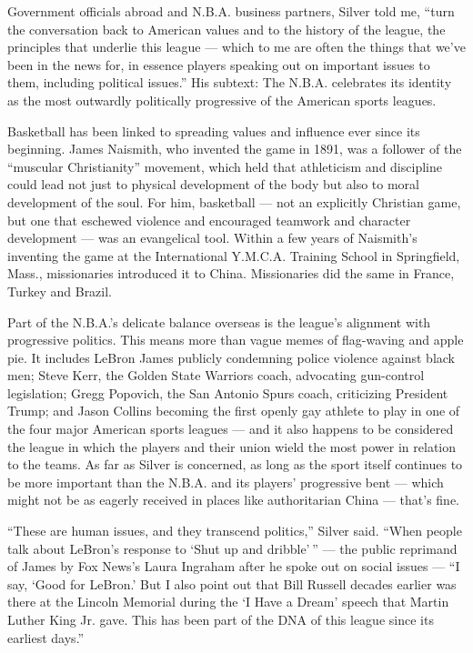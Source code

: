 Government officials abroad and N.B.A. business partners, Silver told
me, ``turn the conversation back to American values and to the history
of the league, the principles that underlie this league --- which to me
are often the things that we've been in the news for, in essence players
speaking out on important issues to them, including political issues.''
His subtext: The N.B.A. celebrates its identity as the most outwardly
politically progressive of the American sports leagues.

Basketball has been linked to spreading values and influence ever since
its beginning. James Naismith, who invented the game in 1891, was a
follower of the ``muscular Christianity'' movement, which held that
athleticism and discipline could lead not just to physical development
of the body but also to moral development of the soul. For him,
basketball --- not an explicitly Christian game, but one that eschewed
violence and encouraged teamwork and character development --- was an
evangelical tool. Within a few years of Naismith's inventing the game at
the International Y.M.C.A. Training School in Springfield, Mass.,
missionaries introduced it to China. Missionaries did the same in
France, Turkey and Brazil.

Part of the N.B.A.'s delicate balance overseas is the league's alignment
with progressive politics. This means more than vague memes of
flag-waving and apple pie. It includes LeBron James publicly condemning
police violence against black men; Steve Kerr, the Golden State Warriors
coach, advocating gun-control legislation; Gregg Popovich, the San
Antonio Spurs coach, criticizing President Trump; and Jason Collins
becoming the first openly gay athlete to play in one of the four major
American sports leagues --- and it also happens to be considered the
league in which the players and their union wield the most power in
relation to the teams. As far as Silver is concerned, as long as the
sport itself continues to be more important than the N.B.A. and its
players' progressive bent --- which might not be as eagerly received in
places like authoritarian China --- that's fine.

``These are human issues, and they transcend politics,'' Silver said.
``When people talk about LeBron's response to `Shut up and dribble' ''
--- the public reprimand of James by Fox News's Laura Ingraham after he
spoke out on social issues --- ``I say, `Good for LeBron.' But I also
point out that Bill Russell decades earlier was there at the Lincoln
Memorial during the `I Have a Dream' speech that Martin Luther King Jr.
gave. This has been part of the DNA of this league since its earliest
days.''

